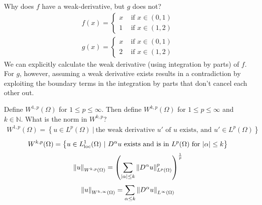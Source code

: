 \documentclass[avery5388,grid,frame]{flashcards}
\begin{document}
\begin{flashcard}
    {Why does $f$ have a weak-derivative, but $g$ does not?
    \begin{equation*}
        \begin{aligned}
            f(x) = \begin{cases}
                x & \text{ if } x \in (0,1) \\
                1 & \text{ if } x \in (1,2)
            \end{cases}
        \end{aligned}
    \end{equation*}
    \begin{equation*}
        \begin{aligned}
            g(x) = \begin{cases}
                x & \text{ if } x \in (0,1) \\
                2 & \text{ if } x \in (1,2)
            \end{cases}
        \end{aligned}
    \end{equation*}}
    We can explicitly calculate the weak derivative (using integration by parts) of $f$.  For $g$, however, assuming a weak derivative exists results in a contradiction by exploiting the boundary terms in the integration by parts that don't cancel each other out.
\end{flashcard}

\begin{flashcard}
    {Define $W^{1,p}(\Omega)$ for $1 \leq p \leq \infty$.  Then define $W^{k,p}(\Omega)$ for $1 \leq p \leq \infty$ and $k \in \mathbb{N}$.  What is the norm in $W^{k,p}$?}
    \begin{align*}
        W^{1,p}(\Omega) = \left\{u \in L^p(\Omega)\ |\ \text{the weak derivative $u'$ of $u$ exists, and } u' \in L^p(\Omega)\right\}
    \end{align*}
    \begin{align*}
        W^{k,p}(\Omega) = \left\{u \in L^1_\text{loc}(\Omega)\ |\ D^\alpha u \text{ exists and is in } L^p(\Omega) \text{ for } \abs{\alpha} \leq k\right\}
    \end{align*}
    \begin{align*}
        \norm{u}_{W^{k,p}(\Omega)} = \qty(\sum_{\abs{\alpha}\leq k}\norm{D^\alpha u}_{L^p(\Omega)}^p)^{\frac{1}{p}}
    \end{align*}
    \begin{align*}
        \norm{u}_{W^{k,\infty}(\Omega)} = \sum_{\alpha \leq k} \norm{D^\alpha u}_{L^\infty(\Omega)}
    \end{align*}
\end{flashcard}
\end{document}
